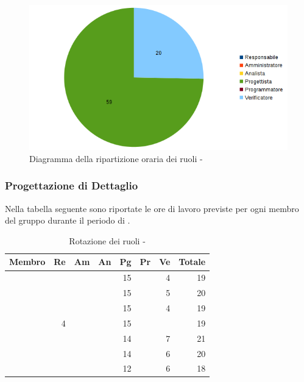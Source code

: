 \documentclass[12pt,a4paper]{article}
\begin{document}
\begin{center}
	\begin{figure}[H]
		\centering	
	    \includegraphics[width=\textwidth]{../img/diagrammaTortaProgettazioneArchitetturaleTotaleOre.png}
		\caption{Diagramma della ripartizione oraria dei ruoli - \FPA{}}
	\end{figure}
\end{center}

\newpage
\subsubsection{Progettazione di Dettaglio}

Nella tabella seguente sono riportate le ore di lavoro previste per ogni membro del gruppo durante il periodo di \FPD{}.

\begin{table}[H]
	\begin{center}
		\begin{tabular}{l r r r r r r r}
			\toprule
			\textbf{Membro}	&	\textbf{Re}	&	\textbf{Am}	& \textbf{An} & \textbf{Pg} & \textbf{Pr} & \textbf{Ve} & \textbf{Totale}\\
			\midrule
			\midrule
			\IB{} & & & & 15 & & 4 & 19 \\
			\midrule
			\AB{} & & & & 15 & & 5 & 20 \\
			\midrule
			\NDC{} & & & & 15 & & 4 & 19 \\
			\midrule
			\TP{} & 4 & & & 15 & & & 19 \\
			\midrule
			\WS{} & & & & 14 & & 7 & 21 \\
			\midrule
			\AVE{} & & & & 14 & & 6 & 20 \\
			\midrule
			\AVI{} & & & & 12 & & 6 & 18 \\
			\bottomrule
		\end{tabular}
		\caption{Rotazione dei ruoli - \FPD{}}
	\end{center}
\end{table}
\end{document}
